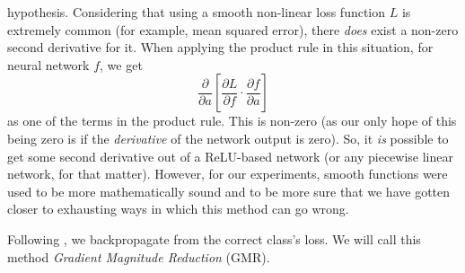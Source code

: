 hypothesis. Considering that using a smooth non-linear loss function $L$ is extremely common (for
example, mean squared error), there \textit{does} exist a non-zero second derivative for it. When
applying the product rule in this situation, for neural network $f$, we get
\[
    \frac{\partial}{\partial a} \left[ \frac{\partial L}{\partial f} \cdot \frac{\partial f}{\partial a} \right]
\]
as one of the terms in the product rule. This is non-zero (as our only hope of this being zero is if
the \textit{derivative} of the network output is zero). So, it \textit{is} possible to get some
second derivative out of a ReLU-based network (or any piecewise linear network, for that matter).
However, for our experiments, smooth functions were used to be more mathematically sound and to be
more sure that we have gotten closer to exhausting ways in which this method can go wrong.

Following \cite{goodfellow2015explaining}, we backpropagate from the correct class's loss. We will
call this method \textit{Gradient Magnitude Reduction} (GMR).